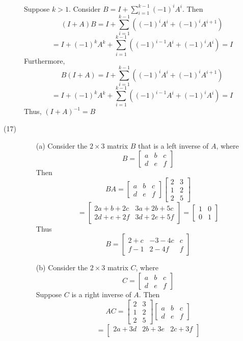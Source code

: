 \documentclass[openany]{book}
\begin{document}
\begin{description}
Suppose $k > 1$. Consider $B = I + \sum_{i=1}^{k-1}(-1)^iA^i$. Then
$$(I+A)B = I + \sum_{i=1}^{k-1}\left((-1)^iA^i + (-1)^iA^{i+1}\right)$$
$$= I + (-1)^kA^k + \sum_{i=1}^{k-1}
\left( (-1)^{i-1}A^i + (-1)^iA^i \right) = I$$
Furthermore,
$$B(I+A) = I + \sum_{i=1}^{k-1}\left((-1)^iA^i + (-1)^iA^{i+1}\right)$$
$$= I + (-1)^kA^k + \sum_{i=1}^{k-1}
\left( (-1)^{i-1}A^i + (-1)^iA^i \right) = I$$
Thus, $(I + A)^{-1} = B$
\item[(17)]
\begin{itemize}
\item[(a)]
Consider the $2 \times 3$ matrix $B$ that is a left inverse of $A$, where
$$B = \begin{bmatrix}
a & b & c \\
d & e & f
\end{bmatrix}$$
Then
$$BA = \begin{bmatrix}
a & b & c \\
d & e & f
\end{bmatrix}\begin{bmatrix}
2 & 3 \\
1 & 2 \\
2 & 5
\end{bmatrix}$$
$$= \begin{bmatrix}
2a + b + 2c & 3a + 2b + 5c \\
2d + e + 2f & 3d + 2e + 5f
\end{bmatrix} = \begin{bmatrix}
1 & 0 \\
0 & 1
\end{bmatrix}$$
Thus
$$B = \begin{bmatrix}
2 + c & -3 - 4c & c \\
f - 1 & 2 - 4f & f
\end{bmatrix}$$
\item[(b)]
Consider the $2 \times 3$ matrix $C$, where
$$C = \begin{bmatrix}
a & b & c \\
d & e & f
\end{bmatrix}$$
Suppose $C$ is a right inverse of $A$. Then
$$AC = \begin{bmatrix}
2 & 3 \\
1 & 2 \\
2 & 5
\end{bmatrix}\begin{bmatrix}
a & b & c \\
d & e & f
\end{bmatrix}$$
$$ = \begin{bmatrix}
2a + 3d & 2b + 3e & 2c + 3f \\

\end{bmatrix}$$
\end{itemize}
\end{description}
\end{document}
